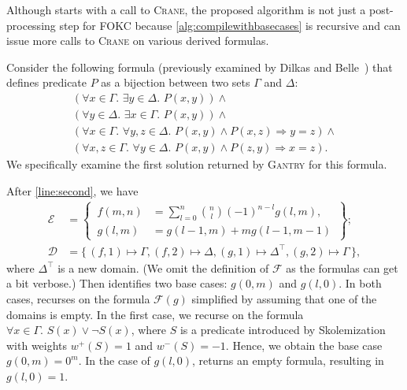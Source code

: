 \documentclass[a4paper,UKenglish,cleveref, autoref, thm-restate]{lipics-v2021}
\newcommand{\Cranetwo}{\textsc{Gantry}}
\begin{document}
\begin{remark}
  Although \CompileWithBaseCases starts with a call to \textsc{Crane}, the
  proposed algorithm is not just a post-processing step for FOKC because
  \cref{alg:compilewithbasecases} is recursive and can issue more calls to
  \textsc{Crane} on various derived formulas.
\end{remark}

\begin{example}\label{example:overall}
  Consider the following formula (previously examined by Dilkas and
  Belle~\cite{DBLP:conf/kr/DilkasB23}) that defines predicate $P$ as a bijection
  between two sets $\Gamma$ and $\Delta$:
  \[
    \begin{gathered}
      (\forall x \in \Gamma\text{. }\exists y \in \Delta\text{. }P(x, y))\land{}\\
      (\forall y \in \Delta\text{. }\exists x \in \Gamma\text{. }P(x, y))\land{}\\
      (\forall x \in \Gamma\text{. }\forall y, z \in \Delta\text{. }P(x, y) \land P(x, z) \Rightarrow y = z)\land{}\\
      (\forall x, z \in \Gamma\text{. }\forall y \in \Delta\text{. }P(x, y) \land P(z, y) \Rightarrow x = z).
    \end{gathered}
  \]
  We specifically examine the first solution returned by \Cranetwo{} for this
  formula.

  After \autoref{line:second}, we have
  \begin{align*}
    \mathcal{E} &= \left\{\,\begin{aligned}f(m, n) &= \sum_{l=0}^{n} \binom{n}{l}{(-1)}^{n-l}g(l, m),\\ g(l, m) &= g(l-1, m) + mg(l-1, m-1)\end{aligned}\,\right\};\\
    \mathcal{D} &= \{\, (f, 1) \mapsto \Gamma, (f, 2) \mapsto \Delta, (g, 1) \mapsto \Delta^{\top}, (g, 2) \mapsto \Gamma \,\},
  \end{align*}
  where $\Delta^{\top}$ is a new domain. (We omit the definition of
  $\mathcal{F}$ as the formulas can get a bit verbose.) Then \FindBaseCases
  identifies two base cases: $g(0, m)$ and $g(l, 0)$. In both cases,
  \CompileWithBaseCases recurses on the formula $\mathcal{F}(g)$ simplified by
  assuming that one of the domains is empty. In the first case, we recurse on
  the formula $\forall x \in \Gamma\text{. }S(x) \lor \neg S(x)$, where $S$ is a
  predicate introduced by Skolemization with weights $w^{+}(S) = 1$ and
  $w^{-}(S) = -1$. Hence, we obtain the base case $g(0, m) = 0^{m}$. In the case
  of $g(l, 0)$,  returns an empty formula,
  resulting in $g(l, 0) = 1$.
\end{example}
\end{document}
